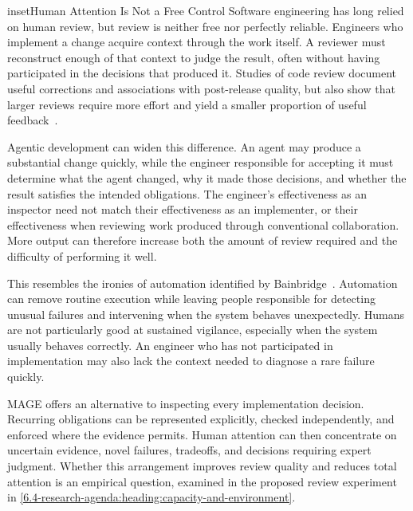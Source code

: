 


\begin{bookbox}{inset}{Human Attention Is Not a Free Control}
\label{inset-human-attention-not-a-free-control}
Software engineering has long relied on human review, but review is neither free nor perfectly reliable. Engineers who implement a change acquire context through the work itself. A reviewer must reconstruct enough of that context to judge the result, often without having participated in the decisions that produced it. Studies of code review document useful corrections and associations with post-release quality, but also show that larger reviews require more effort and yield a smaller proportion of useful feedback~\citep{beller2014modern, mcintosh2014impact, bosu2015useful}.

Agentic development can widen this difference. An agent may produce a substantial change quickly, while the engineer responsible for accepting it must determine what the agent changed, why it made those decisions, and whether the result satisfies the intended obligations. The engineer's effectiveness as an inspector need not match their effectiveness as an implementer, or their effectiveness when reviewing work produced through conventional collaboration. More output can therefore increase both the amount of review required and the difficulty of performing it well.

This resembles the ironies of automation identified by Bainbridge~\citep{bainbridge1983}. Automation can remove routine execution while leaving people responsible for detecting unusual failures and intervening when the system behaves unexpectedly. Humans are not particularly good at sustained vigilance, especially when the system usually behaves correctly. An engineer who has not participated in implementation may also lack the context needed to diagnose a rare failure quickly.

MAGE offers an alternative to inspecting every implementation decision. Recurring obligations can be represented explicitly, checked independently, and enforced where the evidence permits. Human attention can then concentrate on uncertain evidence, novel failures, tradeoffs, and decisions requiring expert judgment. Whether this arrangement improves review quality and reduces total attention is an empirical question, examined in the proposed review experiment in \autoref{6.4-research-agenda:heading:capacity-and-environment}.
\end{bookbox}

